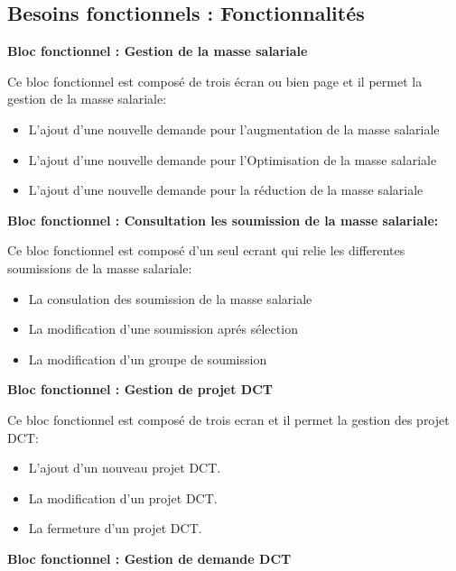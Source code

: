 \subsection{Besoins fonctionnels : Fonctionnalités}

\textbf{\color{red}Bloc fonctionnel : Gestion de la masse salariale}
    
Ce bloc fonctionnel est composé de trois écran ou bien page et il permet la gestion de la masse salariale:
\\
\begin{itemize}
    \item L'ajout d'une nouvelle demande pour l'augmentation de la masse salariale 
    \item L'ajout d'une nouvelle demande pour l'Optimisation de la masse salariale 
    \item L'ajout d'une nouvelle demande pour la réduction de la masse salariale 
\end{itemize}

\vspace{0.5cm}
\textbf{\color{red}Bloc fonctionnel : Consultation les soumission de la masse salariale:}
    
Ce bloc fonctionnel est composé d'un seul ecrant qui relie les differentes soumissions de la masse salariale:
\\
\begin{itemize}
    \item La consulation des soumission de la masse salariale
    \item La modification d'une soumission aprés sélection
    \item La modification d'un groupe de soumission
\end{itemize}

\newpage
\textbf{\color{red}Bloc fonctionnel : Gestion de projet DCT}
    
Ce bloc fonctionnel est composé de trois ecran et il permet la gestion des projet DCT: 
\\
\begin{itemize}
    \item L'ajout d'un nouveau projet DCT.
    \item La modification d'un projet DCT.
    \item La fermeture d'un projet DCT.
\end{itemize}

\vspace{0.5cm}
\textbf{\color{red}Bloc fonctionnel : Gestion de demande DCT}
    
